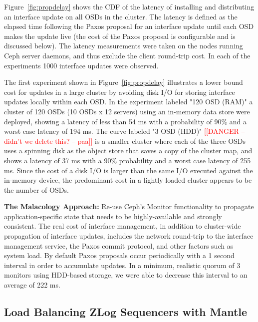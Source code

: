 \documentclass[preprint]{sigplanconf-eurosys}
\newcommand{\paa}[1]{{\textcolor{red}{[[#1 -- paa]]}}}
\begin{document}
Figure~\ref{fig:propdelay} shows the CDF of the latency of installing and
distributing an interface update on all OSDs in the cluster. The latency is
defined as the elapsed time following the Paxos proposal for an interface
update until each OSD makes the update live (the cost of the Paxos proposal is
configurable and is discussed below). The latency measurements were taken on
the nodes running Ceph server daemons, and thus exclude the client round-trip
cost. In each of the experiments 1000 interface updates were observed.

The first experiment shown in Figure~\ref{fig:propdelay} illustrates a lower
bound cost for updates in a large cluster by avoiding disk I/O for storing
interface updates locally within each OSD.  In the experiment labeled "120 OSD
(RAM)" a cluster of 120 OSDs (10 OSDs x 12 servers) using an in-memory data
store were deployed, showing a latency of less than 54 ms with a probability
of 90\% and a worst case latency of 194 ms. The curve labeled "3 OSD (HDD)" 
\paa{DANGER -- didn't we delete this?}
is
a smaller cluster where each of the three OSDs uses a spinning disk as the
object store that saves a copy of the cluster map, and shows a latency of 37
ms with a 90\% probability and a worst case latency of 255 ms. Since the cost
of a disk I/O is larger than the same I/O executed against the in-memory
device, the predominant cost in a lightly loaded cluster appears to be the
number of OSDs.

\textbf{The Malacology Approach:} Re-use Ceph's Monitor functionality to
propagate application-specific state that needs to be highly-available and
strongly consistent.  The real cost of interface management, in addition to
cluster-wide propagation of interface updates, includes the network round-trip
to the interface management service, the Paxos commit protocol, and other
factors such as system load. By default Paxos proposals occur periodically with
a 1 second interval in order to accumulate updates. In a minimum, realistic
quorum of 3 monitors using HDD-based storage, we were able to decrease this
interval to an average of 222 ms.

\subsection{Load Balancing ZLog Sequencers with Mantle}
\end{document}

